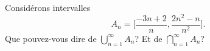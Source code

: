 
\begin{exercice}\label{exo0074}

Considérons intervalles
\[
	A_n=\Big[\frac{-3n+2}{n}, \frac{2n^2-n}{n^2}\Big].
\]
Que pouvez-vous dire de $\bigcup_{n=1}^{\infty} A_n$? Et de $\bigcap_{n=1}^{\infty} A_n$?

\end{exercice}
